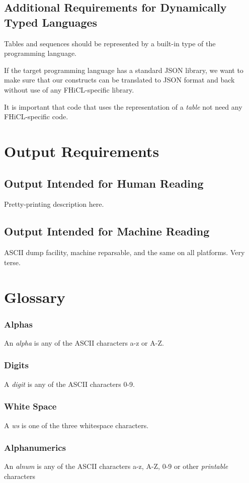 \documentclass{memarticle}
\begin{document}
	\subsection{Additional Requirements for Dynamically Typed Languages}
		Tables and sequences should be represented by a built-in type of the
		programming language.

		If the target programming language has a standard JSON library, we
		want to make sure that our constructs can be translated to JSON format
		and back without use of any FHiCL-specific library.

		It is important that code that uses the representation of a
		\emph{table} not need any FHiCL-specific code.

\section{Output Requirements}

	\subsection{Output Intended for Human Reading}
  		Pretty-printing description here.
	\subsection{Output Intended for Machine Reading}
  		ASCII dump facility, machine reparsable, and the same on all
  		platforms. Very terse.

\section{Glossary}
		\subsubsection{Alphas}
			An \emph{alpha} is any of the ASCII characters a-z or A-Z.
		\subsubsection{Digits}
			A \emph{digit} is any of the ASCII characters 0-9.
		\subsubsection{White Space}
			A \emph{ws} is one of the three whitespace characters.
		\subsubsection{Alphanumerics}
			An \emph{alnum} is any of the ASCII characters a-z, A-Z, 0-9 or other \emph{printable} characters


\end{document}
